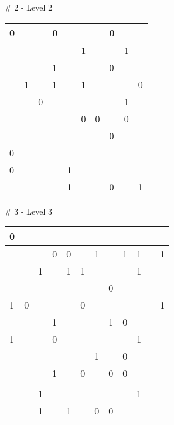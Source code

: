 \medskip

\# 2 - Level 2 \newline
\begin{tabular}{|m{\collen}|m{\collen}|m{\collen}|m{\collen}|m{\collen}|m{\collen}|m{\collen}|m{\collen}|m{\collen}|m{\collen}|}
\hline
  0 &   &   & 0 &   &   &   & 0 &   &   \\
\hline
    &   &   &   &   & 1 &   &   & 1 &   \\
\hline
    &   &   & 1 &   &   &   & 0 &   &   \\
\hline
    & 1 &   & 1 &   & 1 &   &   &   & 0 \\
\hline
    &   & 0 &   &   &   &   &   & 1 &   \\
\hline
    &   &   &   &   & 0 & 0 &   & 0 &   \\
\hline
    &   &   &   &   &   &   & 0 &   &   \\
\hline
  0 &   &   &   &   &   &   &   &   &   \\
\hline
  0 &   &   &   & 1 &   &   &   &   &   \\
\hline
    &   &   &   & 1 &   &   & 0 &   & 1 \\
\hline
\end{tabular}


\medskip

\# 3 - Level 3 \newline
\begin{tabular}{|m{\collen}|m{\collen}|m{\collen}|m{\collen}|m{\collen}|m{\collen}|m{\collen}|m{\collen}|m{\collen}|m{\collen}|m{\collen}|m{\collen}|}
\hline
  0 &   &   &   &   &   &   &   &   &   &   &   \\
\hline
    &   &   & 0 & 0 &   & 1 &   & 1 & 1 &   & 1 \\
\hline
    &   & 1 &   & 1 & 1 &   &   &   & 1 &   &   \\
\hline
    &   &   &   &   &   &   & 0 &   &   &   &   \\
\hline
  1 & 0 &   &   &   & 0 &   &   &   &   &   & 1 \\
\hline
    &   &   & 1 &   &   &   & 1 & 0 &   &   &   \\
\hline
  1 &   &   & 0 &   &   &   &   &   & 1 &   &   \\
\hline
    &   &   &   &   &   & 1 &   & 0 &   &   &   \\
\hline
    &   &   & 1 &   & 0 &   & 0 & 0 &   &   &   \\
\hline
    &   &   &   &   &   &   &   &   &   &   &   \\
\hline
    &   & 1 &   &   &   &   &   &   & 1 &   &   \\
\hline
    &   & 1 &   & 1 &   & 0 & 0 &   &   &   &   \\
\hline
\end{tabular}


